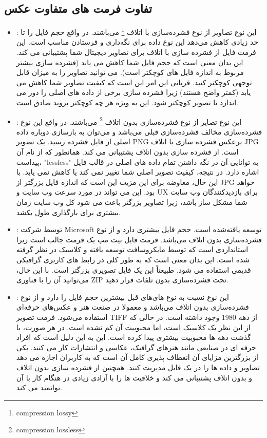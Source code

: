 \subsection{تفاوت فرمت های متفاوت عکس}
\begin{itemize}
    \item {}
    :
    این نوع تصاویر از نوع 
    فشرده‌سازی با اتلاف
    \footnote{compression lossy }
    می‌باشند.
    در 
    واقع حجم فایل را تا حد زیادی کاهش می‌دهد
    این نوع داده برای نگه‌داری و فرستادن مناسب است.
    این فرمت فایل از فشرده سازی با اتلاف برای تصاویر دیجیتال شما پشتیبانی می کند. این بدان معنی است که حجم فایل شما کاهش می یابد (فشرده سازی بیشتر مربوط به اندازه فایل های کوچکتر است). می توانید تصاویر را به میزان قابل توجهی کوچکتر کنید. قربانی این امر این است که کیفیت تصاویر شما کاهش می یابد (کمتر واضح هستند) زیرا فشرده سازی برخی از داده های اصلی را دور می اندازد تا تصویر کوچکتر شود. این به ویژه هر چه کوچکتر بروید صادق است.
    \item {}
    :
    این نوع تصایر از نوع فشرده‌سازی 
    بدون اتلاف
    \footnote{ compression lossless}
    می‌باشند.
    در واقع این نوع فشرده‌سازی مخالف فشرده‌سازی قبلی می‌باشد و می‌توان به بازسازی دوباره داده اصلی از فایل فشرده رسید.
    یک تصویر PNG برعکس فشرده سازی با اتلاف JPG است. از فشرده سازی بدون اتلاف پشتیبانی می کند. همانطور که از نام آن پیداست، "lessless" به توانایی آن در نگه داشتن تمام داده های اصلی در قالب فایل اشاره دارد. در نتیجه، کیفیت تصویر اصلی شما تغییر نمی کند یا کاهش نمی یابد. با این حال، معاوضه برای این مزیت این است که اندازه فایل بزرگتر از JPG خواهد بود. این می تواند در مورد سرعت وب سایت و UX برای بازدیدکنندگان وب سایت شما مشکل ساز باشد، زیرا تصاویر بزرگتر باعث می شود کل وب سایت زمان بیشتری برای بارگذاری طول بکشد.
    \item {}
    :
    توسط شرکت 
    Microsoft   
    توسعه یافته‌شده است.
    حجم فایل بیشتری دارد
    و از نوع 
    فشرده‌سازی بدون اتلاف می‌باشد.
    فرمت فایل بیت مپ یک فرمت جالب است زیرا استانداردی است که توسط مایکروسافت توسعه یافته و کلاسیک در نظر گرفته شده است. این بدان معنی است که به طور کلی در رابط های کاربری گرافیکی قدیمی استفاده می شود. طبیعتاً این یک فایل تصویری بزرگتر است. با این حال، می‌توانید آن را با فناوری ZIP تحت فشرده‌سازی بدون تلفات قرار دهید.
    \item {}
    :
    این نوع نسبت به نوع های‌های قبل بیشترین حجم فایل را دارد و از نوع 
    فشرده‌سازی بدون اتلاف می‌باشد و معمولا در صنعت هنر و عکس‌های حرفه‌ای استفاده می‌شود.
    فرمت تصویر TIFF از دهه 1980 وجود داشته است. در حالی که از این نظر یک کلاسیک است، اما محبوبیت آن کم نشده است. در هر صورت، با گذشت دهه ها محبوبیت بیشتری پیدا کرده است. این به این دلیل است که افراد حرفه ای در صنایعی مانند هنرهای گرافیک، عکاسی و انتشارات کار می کنند. یکی از بزرگترین مزایای آن انعطاف پذیری کامل آن است که به کاربران اجازه می دهد تصاویر و داده ها را در یک فایل مدیریت کنند. همچنین از فشرده سازی بدون اتلاف و بدون اتلاف پشتیبانی می کند و خلاقیت ها را با آزادی زیادی در هنگام کار با آن توانمند می کند.
\end{itemize}

